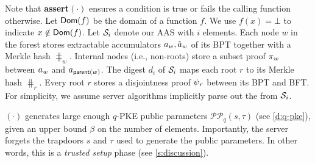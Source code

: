 Note that \textbf{assert$(\cdot)$} ensures a condition is true or fails the calling function otherwise. 
Let $\mathsf{Dom}(f)$ be the domain of a function $f$. %
We use $f(x)=\bot$ to indicate $x\notin \mathsf{Dom}(f)$.
Let $\mathcal{S}_i$ denote our AAS with $i$ elements.
Each node $w$ in the forest stores extractable accumulators $\textcolor{black}{a}_w, \textcolor{black}{\hat{a}}_w$ of its BPT together with a Merkle hash $\hash_w$.
Internal nodes (i.e., non-roots) store a subset proof $\textcolor{black}{\pi}_w$ between $\textcolor{black}{a}_w$ and $\textcolor{black}{a}_{\mathsf{parent}(w)}$.
The digest $d_i$ of $\mathcal{S}_i$ maps each root $r$ to its Merkle hash $\hash_r$.
Every root $r$ stores a disjointness proof $\textcolor{black}{\psi}_r$ between its BPT and BFT.
For simplicity, we assume server algorithms implicitly parse out the  from $\mathcal{S}_i$.

{\setup}$(\cdot)$ generates large enough $q$-PKE public parameters $\mathcal{PP}_q(s,\tau)$ (see \cref{d:q-pke}), given an upper bound $\beta$ on the number of elements.
Importantly, the server forgets the trapdoors $s$ and $\tau$ used to generate the public parameters.
In other words, this is a \emph{trusted setup} phase (see \cref{s:discussion}).

%
%
%

